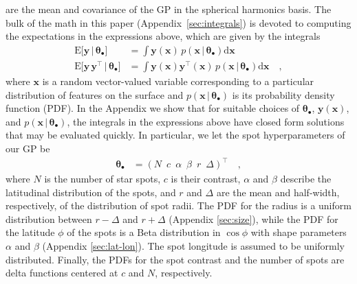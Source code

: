 \documentclass[modern]{aastex62}
\begin{document}
%
are the mean and covariance of the GP in the spherical harmonics basis.
The bulk of the math in this paper (Appendix~\ref{sec:integrals})
is devoted to computing
the expectations in the expressions above, which
are given by the integrals
%
\begin{align}
    \label{eq:exp_y}
    \mathrm{E} \Big[ \mathbf{y} \, \Big| \, \pmb{\theta}_\bullet \Big]
     & =
    \int \mathbf{y}(\mathbf{x} ) \, p(\mathbf{x} \, \big| \, \pmb{\theta}_\bullet)\mathrm{d}\mathbf{x}
    \\
    \label{eq:exp_yy}
    \mathrm{E} \Big[ \mathbf{y} \, \mathbf{y}^\top \, \Big| \, \pmb{\theta}_\bullet \Big]
     & =
    \int \mathbf{y}(\mathbf{x} ) \mathbf{y}^\top(\mathbf{x} ) \, p(\mathbf{x} \, \big| \, \pmb{\theta}_\bullet)\mathrm{d}\mathbf{x}
    \quad,
\end{align}
%
where $\mathbf{x}$ is a random vector-valued variable corresponding to a particular
distribution of features on the surface
and $p(\mathbf{x} \, \big| \, \pmb{\theta}_\bullet)$ is its probability density
function (PDF).
%
In the Appendix we show that for suitable choices of $\pmb{\theta}_\bullet$,
$\mathbf{y}(\mathbf{x})$,
and $p(\mathbf{x} \, \big| \, \pmb{\theta}_\bullet)$, the integrals in the expressions
above have closed form solutions that may be evaluated quickly.
%
In particular, we let the spot hyperparameters of our GP be
%
\begin{align}
    \pmb{\theta}_\bullet
     & =
    \left(
    N
    \,\,\,
    c
    \,\,\,
    \alpha
    \,\,\,
    \beta
    \,\,\,
    r
    \,\,\,
    \Delta
    \right)^\top
    \quad,
\end{align}
%
where $N$ is the number of star spots, $c$ is their contrast,
$\alpha$ and $\beta$ describe the latitudinal
distribution of the spots, and $r$ and $\Delta$ are the mean and
half-width, respectively, of the distribution of spot radii.
%
The PDF for the radius is a uniform distribution
between $r - \Delta$ and $r + \Delta$ (Appendix \ref{sec:size}),
while
the PDF for the latitude $\phi$ of the spots is a Beta distribution in
$\cos\phi$ with shape parameters $\alpha$ and $\beta$ (Appendix \ref{sec:lat-lon}).
The spot longitude is assumed to be uniformly distributed. Finally,
the PDFs for the spot contrast and the number of spots are delta functions
centered at $c$ and $N$, respectively.

\end{document}
